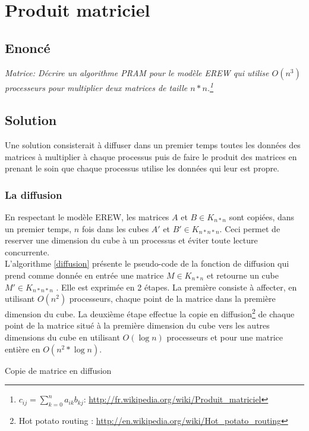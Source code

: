\section{Produit matriciel}

\subsection{Enoncé}
\textit{Matrice: Décrire un algorithme PRAM pour le modèle EREW qui utilise $O(n^3)$ processeurs pour multiplier deux matrices de taille $n*n$.\footnote{$c_{ij} = \sum_{k=0}^n a_{ik} b_{kj}$: \url{http://fr.wikipedia.org/wiki/Produit_matriciel}}}

\subsection{Solution}
Une solution consisterait à diffuser dans un premier temps toutes les données des matrices à multiplier à chaque processus puis de faire le produit des matrices en prenant le soin que chaque processus utilise les données qui leur est propre.

\subsubsection{La diffusion}
En respectant le modèle EREW, les matrices $A$ et $B \in K_{n*n}$ sont copiées, dans un premier temps, $n$ fois dans les cubes $A'$ et $B' \in K_{n*n*n}$. Ceci permet de reserver une dimension du cube à un processus et éviter toute lecture concurrente.\\

L'algorithme \ref{diffusion} présente le pseudo-code de la fonction de diffusion qui prend comme donnée en entrée une matrice $M \in K_{n*n}$ et retourne un cube $M' \in K_{n*n*n}$ . Elle est exprimée en 2 étapes. La première consiste à affecter, en utilisant $O(n^2)$ processeurs, chaque point de la matrice dans la première dimension du cube. La deuxième étape effectue la copie en diffusion\footnote{Hot potato routing : \url{http://en.wikipedia.org/wiki/Hot_potato_routing}} de chaque point de la matrice situé à la première dimension du cube vers les autres dimensions du cube en utilisant $O(\log{n})$ processeurs et pour une matrice entière en $O(n^2 * \log{n})$.

\incmargin{1em}
\begin{algorithm}[here]
  \dontprintsemicolon
  \caption{Copie de matrice en diffusion}
  \label{diffusion}
\end{algorithm}
\decmargin{1em}

